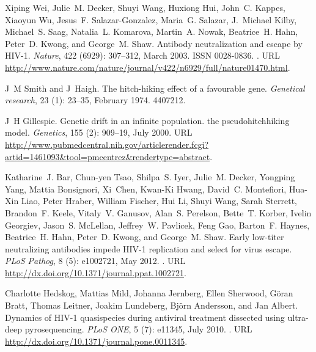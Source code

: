 \documentclass[11pt]{article}
\begin{document}
\begin{thebibliography}{48}
Xiping Wei, Julie~M. Decker, Shuyi Wang, Huxiong Hui, John~C. Kappes, Xiaoyun
  Wu, Jesus~F. Salazar-Gonzalez, Maria~G. Salazar, J.~Michael Kilby, Michael~S.
  Saag, Natalia~L. Komarova, Martin~A. Nowak, Beatrice~H. Hahn, Peter~D. Kwong,
  and George~M. Shaw.
\newblock Antibody neutralization and escape by {HIV-1}.
\newblock \emph{Nature}, 422 (6929): 307--312, March 2003.
\newblock ISSN 0028-0836.
\newblock {}.
\newblock URL
  \url{http://www.nature.com/nature/journal/v422/n6929/full/nature01470.html}.

J~M Smith and J~Haigh.
\newblock The hitch-hiking effect of a favourable gene.
\newblock \emph{Genetical research}, 23 (1): 23--35, February
  1974.
 4407212.

J~H Gillespie.
\newblock Genetic drift in an infinite population. the pseudohitchhiking model.
\newblock \emph{Genetics}, 155 (2): 909--19, July 2000.
\newblock URL
  \url{http://www.pubmedcentral.nih.gov/articlerender.fcgi?artid=1461093&tool=pmcentrez&rendertype=abstract}.

Katharine~J. Bar, Chun-yen Tsao, Shilpa~S. Iyer, Julie~M. Decker, Yongping
  Yang, Mattia Bonsignori, Xi~Chen, Kwan-Ki Hwang, David~C. Montefiori, Hua-Xin
  Liao, Peter Hraber, William Fischer, Hui Li, Shuyi Wang, Sarah Sterrett,
  Brandon~F. Keele, Vitaly~V. Ganusov, Alan~S. Perelson, Bette~T. Korber,
  Ivelin Georgiev, Jason~S. {McLellan}, Jeffrey~W. Pavlicek, Feng Gao,
  Barton~F. Haynes, Beatrice~H. Hahn, Peter~D. Kwong, and George~M. Shaw.
\newblock Early low-titer neutralizing antibodies impede {HIV-1} replication
  and select for virus escape.
\newblock \emph{{PLoS} Pathog}, 8 (5): e1002721, May 2012.
\newblock {}.
\newblock URL \url{http://dx.doi.org/10.1371/journal.ppat.1002721}.

Charlotte Hedskog, Mattias Mild, Johanna Jernberg, Ellen Sherwood, Göran
  Bratt, Thomas Leitner, Joakim Lundeberg, Björn Andersson, and Jan Albert.
\newblock Dynamics of {HIV-1} quasispecies during antiviral treatment dissected
  using ultra-deep pyrosequencing.
\newblock \emph{{PLoS} {ONE}}, 5 (7): e11345, July 2010.
\newblock {}.
\newblock URL \url{http://dx.doi.org/10.1371/journal.pone.0011345}.


\end{thebibliography}
\end{document}
